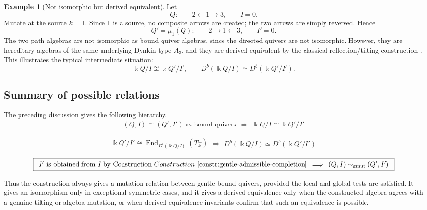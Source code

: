 \documentclass[11pt]{article}
\newcommand{\K}{\Bbbk}
\theoremstyle{plain}
\theoremstyle{definition}
\newtheorem{example}[theorem]{Example}
\theoremstyle{remark}
\begin{document}
\begin{example}[Not isomorphic but derived equivalent]
Let
\[
  Q:
  \qquad
  2\longleftarrow 1\longrightarrow 3,
  \qquad
  I=0.
\]
Mutate at the source \(k=1\).  Since \(1\) is a source, no composite arrows are
created; the two arrows are simply reversed.  Hence
\[
  Q'=\mu_1(Q):
  \qquad
  2\longrightarrow 1\longleftarrow 3,
  \qquad
  I'=0.
\]
The two path algebras are not isomorphic as bound quiver algebras, since the
directed quivers are not isomorphic.  However, they are hereditary algebras of
the same underlying Dynkin type \(A_3\), and they are derived equivalent by the
classical reflection/tilting construction \cite{BernsteinGelfandPonomarev}.
This illustrates the typical intermediate situation:
\[
  \K Q/I\not\cong \K Q'/I',
  \qquad
  D^b(\K Q/I)\simeq D^b(\K Q'/I').
\]
\end{example}

\subsection{Summary of possible relations}

The preceding discussion gives the following hierarchy.
\[
\boxed{
\begin{array}{c}
(Q,I)\cong (Q',I')\text{ as bound quivers}
\end{array}
\Longrightarrow
\begin{array}{c}
\K Q/I\cong \K Q'/I'
\end{array}}
\]

\[
\boxed{
\begin{array}{c}
\K Q'/I'\cong \operatorname{End}_{D^b(\K Q/I)}(T_k^\pm)
\end{array}
\Longrightarrow
\begin{array}{c}
D^b(\K Q/I)\simeq D^b(\K Q'/I')
\end{array}}
\]

\[
\boxed{
\begin{array}{c}
I'\text{ is obtained from }I\text{ by Construction~} 
Construction ~\ref{constr:gentle-admissible-completion}
\end{array}
\Longrightarrow
\begin{array}{c}
(Q,I)\sim_{\mathrm{gmut}}(Q',I')
\end{array}}
\]

Thus the construction always gives a mutation relation between gentle bound
quivers, provided the local and global tests are satisfied.  It gives an
isomorphism only in exceptional symmetric cases, and it gives a derived
equivalence only when the constructed algebra agrees with a genuine tilting or
algebra mutation, or when derived-equivalence invariants confirm that such an
equivalence is possible.
\end{document}

